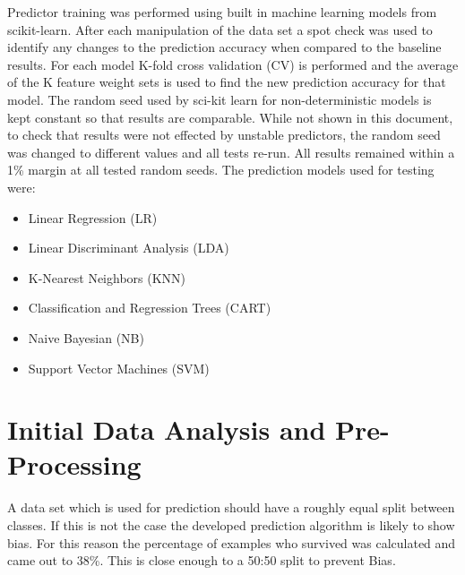 \documentclass{article}
\begin{document}
Predictor training was performed using built in machine learning models from scikit-learn. After each manipulation of the data set a spot check was used to identify any changes to the prediction accuracy when compared to the baseline results. For each model K-fold cross validation (CV) is performed and the average of the K feature weight sets is used to find the new prediction accuracy for that model. The random seed used by sci-kit learn for non-deterministic models is kept constant so that results are comparable. While not shown in this document, to check that results were not effected by unstable predictors, the random seed was changed to different values and all tests re-run. All results remained within a 1\% margin at all tested random seeds.
\linebreak
The prediction models used for testing were:
\begin{itemize}
\item Linear Regression (LR)
\item Linear Discriminant Analysis (LDA)
\item K-Nearest Neighbors (KNN)
\item Classification and Regression Trees (CART)
\item Naive Bayesian (NB)
\item Support Vector Machines (SVM)
\end{itemize}

\newpage

\section{Initial Data Analysis and Pre-Processing}

A data set which is used for prediction should have a roughly equal split between classes. If this is not the case the developed prediction algorithm is likely to show bias. For this reason the percentage of examples who survived was calculated and came out to 38\%. This is close enough to a 50:50 split to prevent Bias.
\end{document}

